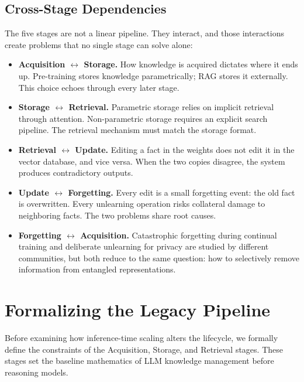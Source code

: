 \documentclass[manuscript, screen, review]{jair}
\begin{document}
\subsection{Cross-Stage Dependencies}

The five stages are not a linear pipeline. They interact, and those interactions create problems that no single stage can solve alone:

\begin{itemize}[leftmargin=*]
  \item \textbf{Acquisition $\leftrightarrow$ Storage.} How knowledge is acquired dictates where it ends up. Pre-training stores knowledge parametrically; RAG stores it externally. This choice echoes through every later stage.
  \item \textbf{Storage $\leftrightarrow$ Retrieval.} Parametric storage relies on implicit retrieval through attention. Non-parametric storage requires an explicit search pipeline. The retrieval mechanism must match the storage format.
  \item \textbf{Retrieval $\leftrightarrow$ Update.} Editing a fact in the weights does not edit it in the vector database, and vice versa. When the two copies disagree, the system produces contradictory outputs.
  \item \textbf{Update $\leftrightarrow$ Forgetting.} Every edit is a small forgetting event: the old fact is overwritten. Every unlearning operation risks collateral damage to neighboring facts. The two problems share root causes.
  \item \textbf{Forgetting $\leftrightarrow$ Acquisition.} Catastrophic forgetting during continual training and deliberate unlearning for privacy are studied by different communities, but both reduce to the same question: how to selectively remove information from entangled representations.
\end{itemize}

\section{Formalizing the Legacy Pipeline}
\label{sec:legacy_pipeline}
\label{sec:retrieval}

Before examining how inference-time scaling alters the lifecycle, we formally define the constraints of the Acquisition, Storage, and Retrieval stages. These stages set the baseline mathematics of LLM knowledge management before reasoning models.
\end{document}
